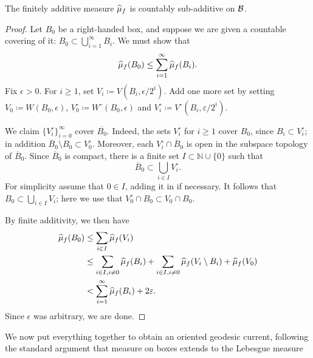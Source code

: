 \begin{proposition}\label{prop:countablyadditive}
  The finitely additive measure $\widehat{\mu}_f$ is countably sub-additive on $\mathcal{B}$.
\end{proposition}

\begin{proof}
  Let $B_0$ be a right-handed box, and suppose we are given a countable covering of it: $B_0 \subset \bigcup_{i=1}^\infty B_i$. We must show that \[
    \widehat{\mu}_f(B_0) \le \sum_{i=1}^\infty \widehat{\mu}_f(B_i).
  \]
  Fix $\epsilon > 0$. For $i \ge 1$, set $V_i \coloneqq V(B_i, \epsilon/2^i)$. Add one more set by setting $V_0 \coloneqq W(B_0,\epsilon)$, $V_0^\circ \coloneqq W^\circ(B_0,\epsilon)$ and $V_i^\circ \coloneqq V^\circ(B_i,\varepsilon/2^i)$.

We claim $\{V_i^\circ\}_{i=0}^\infty$ cover $\overline{B_0}$. Indeed,
the sets $V_i^\circ$ for $i\geq1$
cover $B_0$, since
$B_i\subset V_i^\circ$;
in addition
$\overline{B}_0\setminus B_0\subset V_0^\circ$.
Moreover, each $V_i^\circ\cap\overline{B}_0$
is open in the subspace topology of $\overline{B}_0$. Since
$\overline{B}_0$ is compact, there is a finite set
$I\subset\mathbb N\cup\{0\}$ such that
\[
\overline{B}_0\subset\bigcup_{i\in I}V_i^\circ.
\]
For simplicity assume that $0\in I$, adding it in if necessary. It
follows that $B_0\subset \bigcup_{i\in I} V_i$; here we use that
$V_0^\circ \cap B_0 \subset V_0 \cap B_0$.

  By finite additivity, we then have
  \begin{align*}
    \widehat{\mu}_f(B_0) &\le \sum_{i \in I} \widehat{\mu}_f(V_i)\\
      &\le \sum_{i \in I, i \ne 0} \widehat{\mu}_f(B_i) + \sum_{i \in I, i \ne 0}
        \widehat{\mu}_f(V_i \setminus B_i) + \widehat{\mu}_f(V_0)\\
      &< \sum_{i=1}^\infty \widehat{\mu}_f(B_i) + 2\varepsilon.
  \end{align*}
  Since $\epsilon$ was arbitrary, we are done.
\end{proof}

We now put everything together to obtain an oriented geodesic current,
following the standard argument that measure on boxes extends to the
Lebesgue measure

